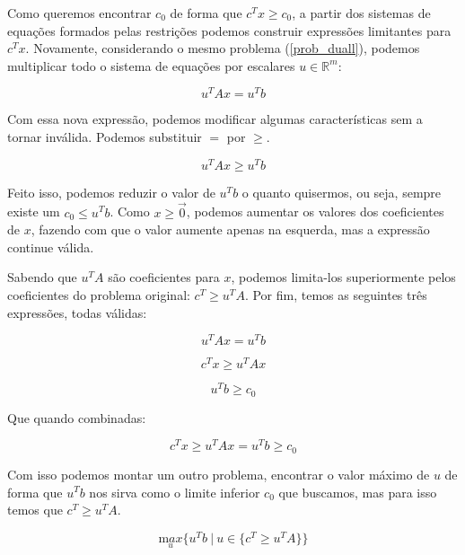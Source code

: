 Como queremos encontrar \(c_0\) de forma que \(c^Tx \geq c_0\), a partir dos sistemas de equações
formados pelas restrições podemos construir expressões limitantes para \(c^Tx\). Novamente,
considerando o mesmo problema (\ref{prob_duall}), podemos multiplicar todo o sistema de
equações por escalares \(u \in \mathbb{R}^m\):

\begin{equation}
u^TAx = u^Tb
\end{equation}

Com essa nova expressão, podemos modificar algumas características sem a tornar inválida.
Podemos substituir \(=\) por \(\geq\).

\begin{equation}
u^TAx \geq u^Tb
\end{equation}

Feito isso, podemos reduzir o valor de \(u^Tb\) o quanto quisermos, ou seja, sempre existe
um \(c_0 \leq u^Tb\). Como \(x \geq \overrightarrow{\mathrm 0}\), podemos aumentar os valores dos
coeficientes de \(x\), fazendo com que o valor aumente apenas na esquerda, mas a expressão
continue válida.

Sabendo que \(u^TA\) são coeficientes para \(x\), podemos limita-los superiormente pelos
coeficientes do problema original: \(c^T \geq u^TA\). Por fim, temos as seguintes três expressões, todas
válidas:

\begin{equation}
  u^TAx = u^Tb
\end{equation}

\begin{equation}
  c^Tx \geq u^TAx
\end{equation}

\begin{equation}
  u^Tb \geq c_0
\end{equation}

Que quando combinadas:

\begin{equation}
c^Tx \geq u^TAx = u^Tb \geq c_0
\end{equation}

Com isso podemos montar um outro problema, encontrar o valor máximo de \(u\) de forma que \(u^Tb\)
nos sirva como o limite inferior \(c_0\) que buscamos, mas para isso temos que \(c^T \geq u^TA \).

\begin{equation}
\underset{u}{\mathrm max}\{u^Tb\ |\ u \in \{c^T \geq u^TA \} \}
\end{equation}

